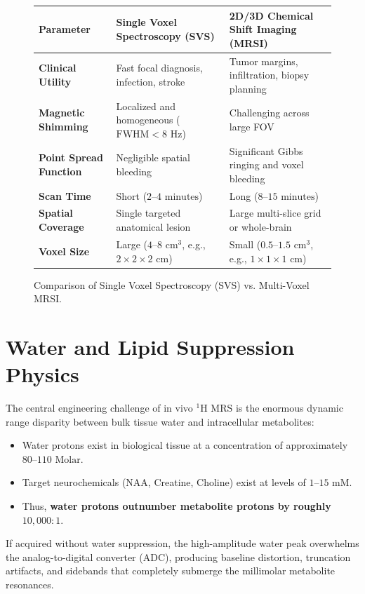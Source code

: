 \documentclass[11pt,a4paper]{article}
\begin{document}
\begin{figure}[htbp]
\centering
\begin{tcolorbox}[colback=purple!5!white,colframe=purple!60!black,title=\textbf{Technical Trade-offs: Single Voxel SVS vs.\ Multi-Voxel MRSI},width=\linewidth]
\small
\setlength{\tabcolsep}{2.5pt}
\begin{tabular}{p{2.6cm} p{5.5cm} p{5.5cm}}
\toprule
\textbf{Parameter} & \textbf{Single Voxel Spectroscopy (SVS)} & \textbf{2D/3D Chemical Shift Imaging (MRSI)} \\
\midrule
\textbf{Clinical Utility} & Fast focal diagnosis, infection, stroke & Tumor margins, infiltration, biopsy planning \\
\addlinespace
\textbf{Magnetic Shimming} & Localized and homogeneous ($\text{FWHM} < 8\text{ Hz}$) & Challenging across large FOV \\
\addlinespace
\textbf{Point Spread Function} & Negligible spatial bleeding & Significant Gibbs ringing and voxel bleeding \\
\addlinespace
\textbf{Scan Time} & Short ($2\text{--}4\text{ minutes}$) & Long ($8\text{--}15\text{ minutes}$) \\
\addlinespace
\textbf{Spatial Coverage} & Single targeted anatomical lesion & Large multi-slice grid or whole-brain \\
\addlinespace
\textbf{Voxel Size} & Large ($4\text{--}8\text{ cm}^3$, e.g., $2 \times 2 \times 2\text{ cm}$) & Small ($0.5\text{--}1.5\text{ cm}^3$, e.g., $1 \times 1 \times 1\text{ cm}$) \\
\bottomrule
\end{tabular}
\end{tcolorbox}
\caption{Comparison of Single Voxel Spectroscopy (SVS) vs. Multi-Voxel MRSI.}
\label{fig:svs_vs_mrsi}
\end{figure}

\section{Water and Lipid Suppression Physics}
The central engineering challenge of in vivo $^1\text{H}$ MRS is the enormous dynamic range disparity between bulk tissue water and intracellular metabolites:
\begin{itemize}
    \item Water protons exist in biological tissue at a concentration of approximately $80\text{--}110\text{ Molar}$.
    \item Target neurochemicals (NAA, Creatine, Choline) exist at levels of $1\text{--}15\text{ mM}$.
    \item Thus, \textbf{water protons outnumber metabolite protons by roughly $10,000 : 1$}.
\end{itemize}
If acquired without water suppression, the high-amplitude water peak overwhelms the analog-to-digital converter (ADC), producing baseline distortion, truncation artifacts, and sidebands that completely submerge the millimolar metabolite resonances.
\end{document}
